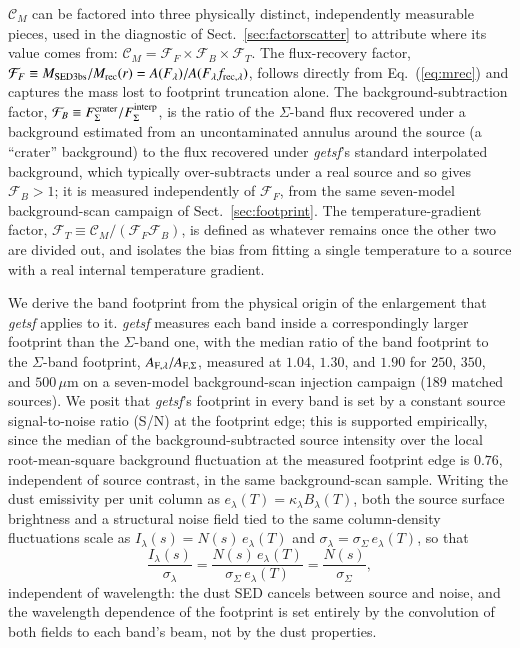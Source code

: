 \documentclass{aa}
\newcommand{\CM}{\mathcal{C}_{M}}
\newcommand{\Fflux}{\mathcal{F}_{F}}
\newcommand{\Ftemp}{\mathcal{F}_{T}}
\newcommand{\Fbg}{\mathcal{F}_{B}}
\newcommand{\Mrec}{M_{\rm rec}}
\begin{document}
$\CM$ can be factored into three physically distinct, independently
measurable pieces, used in the diagnostic of Sect.~\ref{sec:factorscatter}
to attribute where its value comes from: $\CM=\Fflux\times
\Fbg\times \Ftemp$. The flux-recovery factor,
$\Fflux\equiv M_{\rm SED3bs}/\Mrec(r) = A(F_\lambda)/
A(F_\lambda f_{{{\rm rec}},\lambda})$, follows directly from
Eq.~(\ref{eq:mrec}) and captures the mass lost to footprint truncation
alone. The background-subtraction factor,
$\Fbg\equiv F_\Sigma^{\rm crater}/F_\Sigma^{\rm interp}$, is the
ratio of the $\Sigma$-band flux recovered under a background estimated from an
uncontaminated annulus around the source (a ``crater'' background) to the
flux recovered under \emph{getsf}'s standard interpolated background,
which typically over-subtracts under a real source and so gives
$\Fbg>1$; it is measured independently of $\Fflux$, from the
same seven-model background-scan campaign of Sect.~\ref{sec:footprint}.
The temperature-gradient factor, $\Ftemp\equiv \CM/(\Fflux
\Fbg)$, is defined as whatever remains once the other two are
divided out, and isolates the bias from fitting a single temperature to a
source with a real internal temperature gradient.

We derive the band footprint from the physical origin of the enlargement
that \emph{getsf} applies to it. \emph{getsf} measures each band inside a
correspondingly larger footprint than the $\Sigma$-band one, with the median
ratio of the band footprint to the $\Sigma$-band footprint,
$A_{{{\rm F}},\lambda}/A_{{{\rm F}},\Sigma}$, measured at $1.04$, $1.30$, and
$1.90$ for $250$, $350$, and $500\,\mu$m on a seven-model background-scan
injection campaign (189 matched sources). We posit that \emph{getsf}'s footprint in every band is set by
a constant source signal-to-noise ratio (S/N) at the footprint edge; this is
supported empirically, since the median of the background-subtracted source
intensity over the local root-mean-square background fluctuation at the
measured footprint edge is $0.76$, independent of source contrast, in the
same background-scan sample. Writing the dust emissivity per unit column as
$e_\lambda(T)=\kappa_\lambda B_\lambda(T)$, both the source surface
brightness and a structural noise field tied to the same column-density
fluctuations scale as $I_\lambda(s)=N(s)\,e_\lambda(T)$ and
$\sigma_\lambda=\sigma_\Sigma\,e_\lambda(T)$, so that
\begin{equation}
  \frac{I_\lambda(s)}{\sigma_\lambda}
    = \frac{N(s)\,e_\lambda(T)}{\sigma_\Sigma\,e_\lambda(T)}
    = \frac{N(s)}{\sigma_\Sigma},
  \label{eq:sncancel}
\end{equation}
independent of wavelength: the dust SED cancels between source and noise,
and the wavelength dependence of the footprint is set entirely by the
convolution of both fields to each band's beam, not by the dust properties.
\end{document}
